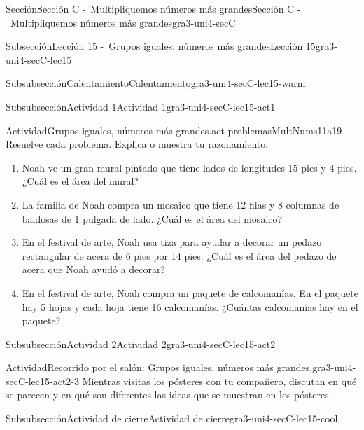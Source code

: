 \documentclass[twoside,14pt,]{extarticle}
\begin{document}
\begin{sectionptx}{Sección}{Sección C -~Multipliquemos números más grandes}{}{Sección C -~Multipliquemos números más grandes}{}{}{gra3-uni4-secC}
\begin{subsectionptx}{Subsección}{Lección 15 -~Grupos iguales, números más grandes}{}{Lección 15}{}{}{gra3-uni4-secC-lec15}
\begin{subsubsectionptx}{Subsubsección}{Calentamiento}{}{Calentamiento}{}{}{gra3-uni4-secC-lec15-warm}
\end{subsubsectionptx}
%
%
\typeout{************************************************}
\typeout{************************************************}
%
\begin{subsubsectionptx}{Subsubsección}{Actividad 1}{}{Actividad 1}{}{}{gra3-uni4-secC-lec15-act1}
\begin{activity}{Actividad}{Grupos iguales, números más grandes.}{act-problemasMultNums11a19}%
Resuelve cada problema. Explica o muestra tu razonamiento.%
%
\begin{enumerate}
\item{}Noah ve un gran mural pintado que tiene lados de longitudes 15 pies y 4 pies. ¿Cuál es el área del mural?%
\item{}La familia de Noah compra un mosaico que tiene 12 filas y 8 columnas de baldosas de 1 pulgada de lado. ¿Cuál es el área del mosaico?%
\item{}En el festival de arte, Noah usa tiza para ayudar a decorar un pedazo rectangular de acera de 6 pies por 14 pies. ¿Cuál es el área del pedazo de acera que Noah ayudó a decorar?%
\item{}En el festival de arte, Noah compra un paquete de calcomanías. En el paquete hay 5 hojas y cada hoja tiene 16 calcomanías. ¿Cuántas calcomanías hay en el paquete?%
\end{enumerate}
\end{activity}%
\end{subsubsectionptx}
%
%
\typeout{************************************************}
\typeout{************************************************}
%
\begin{subsubsectionptx}{Subsubsección}{Actividad 2}{}{Actividad 2}{}{}{gra3-uni4-secC-lec15-act2}
\begin{activity}{Actividad}{Recorrido por el salón: Grupos iguales, números más grandes.}{gra3-uni4-secC-lec15-act2-3}%
Mientras visitas los pósteres con tu compañero, discutan en qué se parecen y en qué son diferentes las ideas que se muestran en los pósteres.%
\end{activity}%
\end{subsubsectionptx}
%
%
\typeout{************************************************}
\typeout{************************************************}
%
\begin{subsubsectionptx}{Subsubsección}{Actividad de cierre}{}{Actividad de cierre}{}{}{gra3-uni4-secC-lec15-cool}

\end{subsubsectionptx}
\end{subsectionptx}
\end{sectionptx}
\end{document}
